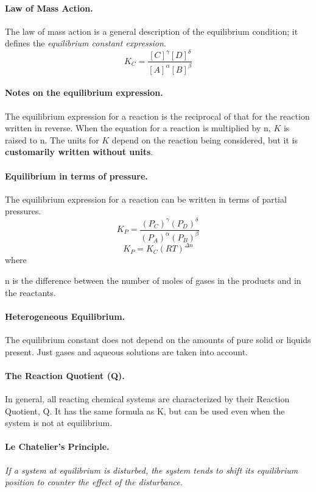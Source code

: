 \documentclass{book}
\begin{document}
\paragraph{Law of Mass Action.} The law of mass action is a general description of the equilibrium condition;
it defines the \textit{equilibrium constant expression}.
\[K_C = \frac{[C]^\gamma [D]^\delta}{[A]^\alpha [B]^\beta}\]

\paragraph{Notes on the equilibrium expression.} The equilibrium expression for a reaction is the reciprocal of that
for the reaction written in reverse. When the equation for a reaction is multiplied by n, \(K\) is raised to n.
The units for \(K\) depend on the reaction being considered, but it is \textbf{customarily written without units}.

\paragraph{Equilibrium in terms of pressure.} The equilibrium expression for a reaction can be written in terms of partial pressures.
\[K_P = \frac{\left(P_C\right)^\gamma \left(P_D\right)^\delta}{\left(P_A\right)^\alpha \left(P_B\right)^\beta}\]
\[K_P = K_C (RT)^{\Delta n}\]
where

n is the difference between the number of moles of gases in the products and in the reactants.

\paragraph{Heterogeneous Equilibrium.} The equilibrium constant does not depend on the amounts of pure solid
or liquids present. Just gases and aqueous solutions are taken into account.

\paragraph{The Reaction Quotient (Q).} In general, all reacting chemical systems are characterized by their
Reaction Quotient, Q. It has the same formula as K, but can be used even when the system is not at equilibrium.

\paragraph{Le Chatelier's Principle.} \textit{If a system at equilibrium is disturbed, the system tends to shift its
equilibrium position to counter the effect of the disturbance.}
\end{document}
